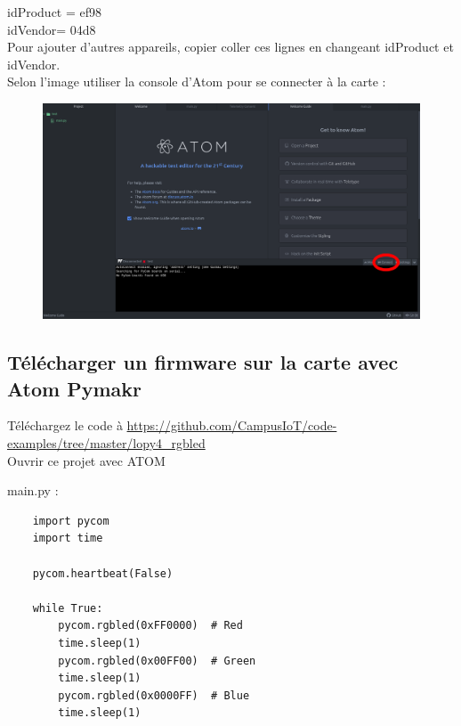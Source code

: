 \documentclass{article}
\begin{document}
idProduct = ef98\\
idVendor= 04d8\\

Pour ajouter d'autres appareils, copier coller ces lignes en changeant idProduct et idVendor. \\


Selon l'image utiliser la console d'Atom pour se connecter à la carte :



  \begin{figure}[H]
\begin{center}
\advance\leftskip-3cm
\advance\rightskip-3cm
\includegraphics[keepaspectratio=true,scale=0.3]{atom_connect.png}
\label{visina8}
\end{center}\end{figure}


\subsection{Télécharger un firmware sur la carte avec Atom Pymakr}
Téléchargez le code à \url{https://github.com/CampusIoT/code-examples/tree/master/lopy4_rgbled} \\

Ouvrir ce projet avec ATOM

main.py :
 \begin{verbatim}
    import pycom
    import time

    pycom.heartbeat(False)

    while True:
        pycom.rgbled(0xFF0000)  # Red
        time.sleep(1)
        pycom.rgbled(0x00FF00)  # Green
        time.sleep(1)
        pycom.rgbled(0x0000FF)  # Blue
        time.sleep(1)
        
    \end{verbatim}
\end{document}
